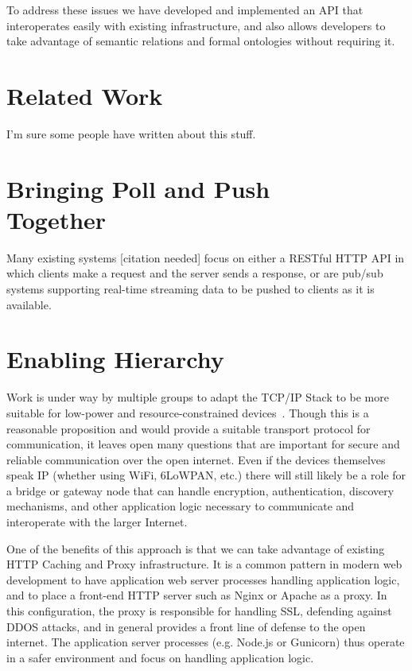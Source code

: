 \documentclass{acm_proc_article-sp}
\begin{document}
To address these issues we have developed and implemented an API that interoperates
easily with existing infrastructure, and also allows developers to take advantage
of semantic relations and formal ontologies without requiring it.

\section{Related Work}

I'm sure some people have written about this stuff.

\section{Bringing Poll and Push\\ Together}

Many existing systems [citation needed] focus on either a RESTful HTTP API in
which clients make a request and the server sends a response, or are pub/sub
systems supporting real-time streaming data to be pushed to clients as it is
available.

\section{Enabling Hierarchy}

Work is under way by multiple groups to adapt the TCP/IP Stack to be more
suitable for low-power and resource-constrained devices~\cite{iotsurvey}.
Though this is a reasonable proposition and would provide a suitable transport
protocol for communication, it leaves open many questions that are important
for secure and reliable communication over the open internet. Even if the
devices themselves speak IP (whether using WiFi, 6LoWPAN, etc.) there will
still likely be a role for a bridge or gateway node that can handle encryption,
authentication, discovery mechanisms, and other application logic necessary to
communicate and interoperate with the larger Internet.

One of the benefits of this approach is that we can take advantage of existing
HTTP Caching and Proxy infrastructure. It is a common pattern in modern web
development to have application web server processes handling application
logic, and to place a front-end HTTP server such as Nginx or Apache as a proxy.
In this configuration, the proxy is responsible for handling SSL, defending
against DDOS attacks, and in general provides a front line of defense to the
open internet. The application server processes (e.g. Node.js or Gunicorn) thus
operate in a safer environment and focus on handling application logic.
\end{document}
